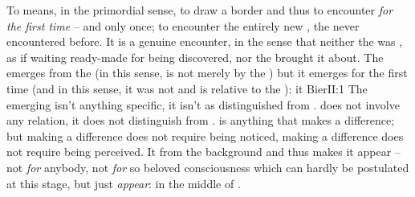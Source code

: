 To  means, in the primordial sense, to draw a border and thus to
encounter {\em for the first time} -- and only once; to encounter the entirely
new , the  never encountered before. It is a genuine
encounter, in the sense that neither the   was
, as if waiting ready-made for being discovered, nor the
 brought it about. The  emerges from the
 (in this sense, is not merely  by the
) but it emerges for the first time (and in this sense, it was not
 and is relative to the ): it
\citet{is not only a reflection but also a creative
  transformation.}{Bier}{II:1\label{ftnt:Bier}}
The emerging  isn't
anything specific, it isn't  as distinguished from .  does not involve any relation, it does not
distinguish  from .   is anything that makes
a difference; but making a difference does not require being noticed, making a
difference does not require being perceived. It  
from the background and thus makes it appear -- not {\em for} anybody, not {\em
  for} so beloved consciousness which can hardly be postulated at this stage,
but just {\em appear}: in the middle of .



